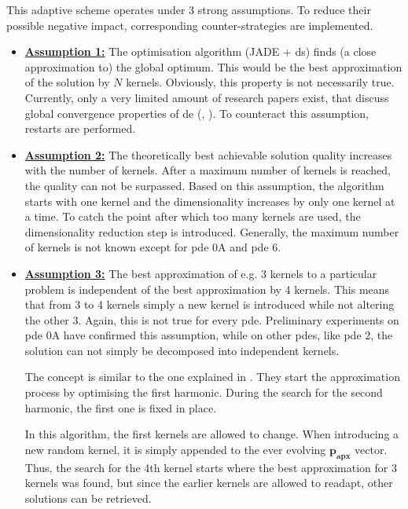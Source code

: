 \documentclass[./\jobname.tex]{subfiles}
\begin{document}
This adaptive scheme operates under 3 strong assumptions. To reduce their possible negative impact, corresponding counter-strategies are implemented. 
\begin{itemize}
	\item \underline{\textbf{Assumption 1:}} The optimisation algorithm (JADE + \gls{ds}) finds (a close approximation to) the global optimum. This would be the best approximation of the solution by $N$ kernels. Obviously, this property is not necessarily true. Currently, only a very limited amount of research papers exist, that discuss global convergence properties of \gls{de} (\cite{hu_sufficient_2013}, \cite{opara_differential_2019}). To counteract this assumption, restarts are performed. 
	\item \underline{\textbf{Assumption 2:}} The theoretically best achievable solution quality increases with the number of kernels. After a maximum number of kernels is reached, the quality can not be surpassed. Based on this assumption, the algorithm starts with one kernel and the dimensionality increases by only one kernel at a time. To catch the point after which too many kernels are used, the dimensionality reduction step is introduced. Generally, the maximum number of kernels is not known except for \gls{pde} 0A and \gls{pde} 6. 
	\item \underline{\textbf{Assumption 3:}} The best approximation of e.g. 3 kernels to a particular problem is independent of the best approximation by 4 kernels. This means that from 3 to 4 kernels simply a new kernel is introduced while not altering the other 3. Again, this is not true for every \gls{pde}. Preliminary experiments on \gls{pde} 0A have confirmed this assumption, while on other \gls{pde}s, like \gls{pde} 2, the solution can not simply be decomposed into independent kernels. 
	
	The concept is similar to the one explained in \cite{chaquet_solving_2012}. They start the approximation process by optimising the first harmonic. During the search for the second harmonic, the first one is fixed in place. 
	
	In this algorithm, the first kernels are allowed to change. When introducing a new random kernel, it is simply appended to the ever evolving $\mathbf{p_{apx}}$ vector. Thus, the search for the 4th kernel starts where the best approximation for 3 kernels was found, but since the earlier kernels are allowed to readapt, other solutions can be retrieved.
\end{itemize} 
\end{document}
